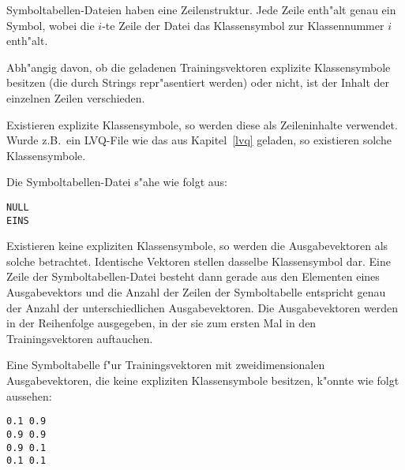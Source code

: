 Symboltabellen-Dateien haben eine Zeilenstruktur.
Jede Zeile enth"alt genau ein Symbol, wobei 
die $i$-te Zeile der Datei das Klassensymbol zur Klassennummer $i$ enth"alt.

Abh"angig davon, ob die geladenen Trainingsvektoren explizite
Klassensymbole besitzen (die durch Strings repr"asentiert werden) oder nicht,
ist der Inhalt der einzelnen Zeilen verschieden.

Existieren explizite Klassensymbole, so werden diese als 
Zeileninhalte verwendet.
Wurde z.B.~ein LVQ-File wie das aus Kapitel~\ref{lvq} geladen, so existieren
solche Klassensymbole. \\ 
\begin{samepage} Die Symboltabellen-Datei s"ahe wie folgt aus:
\begin{verbatim}
NULL
EINS
\end{verbatim}
\end{samepage}

Existieren keine expliziten Klassensymbole, so werden die Ausgabevektoren
als solche betrachtet.
Identische Vektoren stellen dasselbe Klassensymbol dar.
Eine Zeile der Sym\-bol\-tabel\-len-Datei besteht dann gerade aus den Elementen
eines Ausgabevektors und die
Anzahl der Zeilen der Symboltabelle entspricht genau der Anzahl der
unterschiedlichen Ausgabevektoren.
Die Ausgabevektoren werden in der Reihenfolge ausgegeben, in der sie 
zum ersten Mal in den Trainingsvektoren auftauchen.

\begin{samepage}
Eine Symboltabelle f"ur Trainingsvektoren mit zweidimensionalen 
Ausgabevektoren, die keine expliziten Klassensymbole besitzen, k"onnte
wie folgt aussehen:
\begin{verbatim}
0.1 0.9
0.9 0.9
0.9 0.1
0.1 0.1
\end{verbatim}
\end{samepage}
